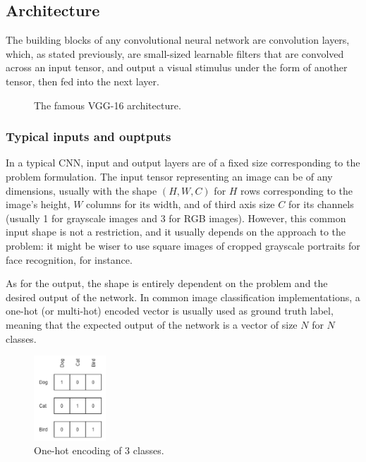 \subsection{Architecture}

The building blocks of any convolutional neural network are convolution layers,
which, as stated previously, are small-sized learnable filters that are
convolved across an input tensor, and output a visual stimulus under the form of
another tensor, then fed into the next layer.

\begin{figure}[h]
	\center
	\resizebox{480pt}{!}{
		
	}
	\caption{The famous VGG-16 architecture.}
	\label{fig:vgg16}
\end{figure}

	\subsubsection{Typical inputs and ouptputs}
In a typical CNN, input and output layers are of a fixed size corresponding to
the problem formulation. The input tensor representing an image can be of any
dimensions, usually with the shape $(H, W, C)$ for $H$ rows corresponding to the
image's height, $W$ columns for its width, and of third axis size $C$ for its
channels (usually 1 for grayscale images and 3 for RGB images). However, this
common input shape is not a restriction, and it usually depends on the approach
to the problem: it might be wiser to use square images of cropped grayscale
portraits for face recognition, for instance.\\


As for the output, the shape is entirely dependent on the problem and the
desired output of the network. In common image classification implementations,
a one-hot (or multi-hot) encoded vector is usually used as ground truth label,
meaning that the expected output of the network is a vector of size $N$ for $N$
classes.

\begin{figure}
	\begin{center}
		\includegraphics[width=0.24\textwidth]{figure/one_hot.png}
	\end{center}
	\label{fig:onehot}
	\caption{One-hot encoding of 3 classes.}
\end{figure}



